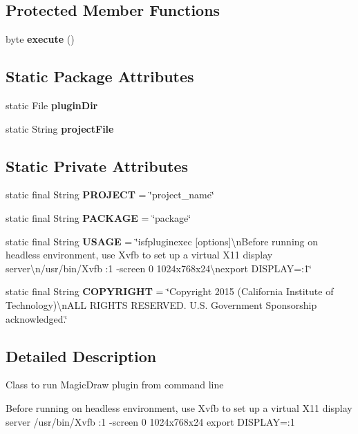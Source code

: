 \subsection*{Protected Member Functions}
\begin{DoxyCompactItemize}
\item 
byte {\bf execute} ()
\end{DoxyCompactItemize}
\subsection*{Static Package Attributes}
\begin{DoxyCompactItemize}
\item 
static File {\bf plugin\+Dir}
\item 
static String {\bf project\+File}
\end{DoxyCompactItemize}
\subsection*{Static Private Attributes}
\begin{DoxyCompactItemize}
\item 
static final String {\bf P\+R\+O\+J\+E\+CT} = \char`\"{}project\+\_\+name\char`\"{}
\item 
static final String {\bf P\+A\+C\+K\+A\+GE} = \char`\"{}package\char`\"{}
\item 
static final String {\bf U\+S\+A\+GE} = \char`\"{}isfpluginexec [options]\textbackslash{}n\+Before running on headless environment, use Xvfb to set up a virtual X11 display server\textbackslash{}n/usr/bin/Xvfb \+:1 -\/screen 0 1024x768x24\textbackslash{}nexport D\+I\+S\+P\+L\+A\+Y=\+:1\char`\"{}
\item 
static final String {\bf C\+O\+P\+Y\+R\+I\+G\+HT} = \char`\"{}Copyright 2015 (California Institute of Technology)\textbackslash{}n\+A\+LL R\+I\+G\+H\+TS R\+E\+S\+E\+R\+V\+E\+D. U.\+S. Government Sponsorship acknowledged.\char`\"{}
\end{DoxyCompactItemize}


\subsection{Detailed Description}
Class to run Magic\+Draw plugin from command line

Before running on headless environment, use Xvfb to set up a virtual X11 display server {\ttfamily /usr/bin/\+Xvfb \+:1 -\/screen 0 1024x768x24 export D\+I\+S\+P\+L\+AY=\+:1 }

